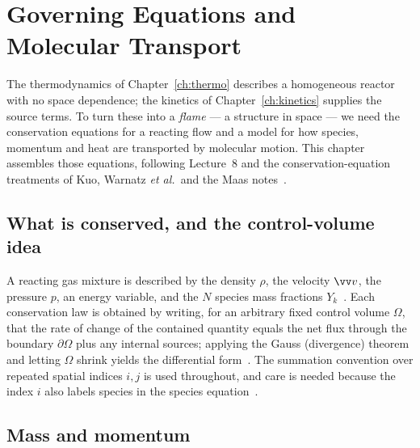 \chapter{Governing Equations and Molecular Transport}\label{ch:governing}

The thermodynamics of Chapter~\ref{ch:thermo} describes a homogeneous reactor with no space dependence; the kinetics of Chapter~\ref{ch:kinetics} supplies the source terms. To turn these into a \emph{flame} --- a structure in space --- we need the conservation equations for a reacting flow and a model for how species, momentum and heat are transported by molecular motion. This chapter assembles those equations, following Lecture~8 and the conservation-equation treatments of Kuo, Warnatz \emph{et al.}\ and the Maas notes~\cite{lecture8,kuo2005conservation,warnatz2006combustion,maas_combustion_lecture}.

\section{What is conserved, and the control-volume idea}

A reacting gas mixture is described by the density $\rho$, the velocity $\vv v$, the pressure $p$, an energy variable, and the $N$ species mass fractions $Y_k$~\cite{lecture1,lecture8}. Each conservation law is obtained by writing, for an arbitrary fixed control volume $\Omega$, that the rate of change of the contained quantity equals the net flux through the boundary $\partial\Omega$ plus any internal sources; applying the Gauss (divergence) theorem and letting $\Omega$ shrink yields the differential form~\cite{lecture8}. The summation convention over repeated spatial indices $i,j$ is used throughout, and care is needed because the index $i$ also labels species in the species equation~\cite{lecture8}.

\section{Mass and momentum}

